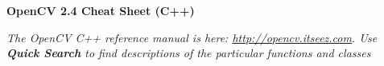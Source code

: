 \documentclass[10pt,landscape]{article}
\makeatletter
\renewcommand{\section}{\@startsection{section}{1}{0mm}%
                                {-1ex plus -.5ex minus -.2ex}%
                                {0.5ex plus .2ex}%
                                {\normalfont\large\bfseries}}
\makeatother
\begin{document}
\raggedright
\footnotesize
\begin{multicols}{3}


\setlength{\premulticols}{1pt}
\setlength{\postmulticols}{1pt}
\setlength{\multicolsep}{1pt}
\setlength{\columnsep}{2pt}

\begin{center}
     \Large{\textbf{OpenCV 2.4 Cheat Sheet (C++)}} \\
\end{center}
\newlength{\MyLen}


\emph{The OpenCV C++ reference manual is here: \url{http://opencv.itseez.com}. Use \textbf{Quick Search} to find descriptions of the particular functions and classes}


\end{multicols}
\end{document}
